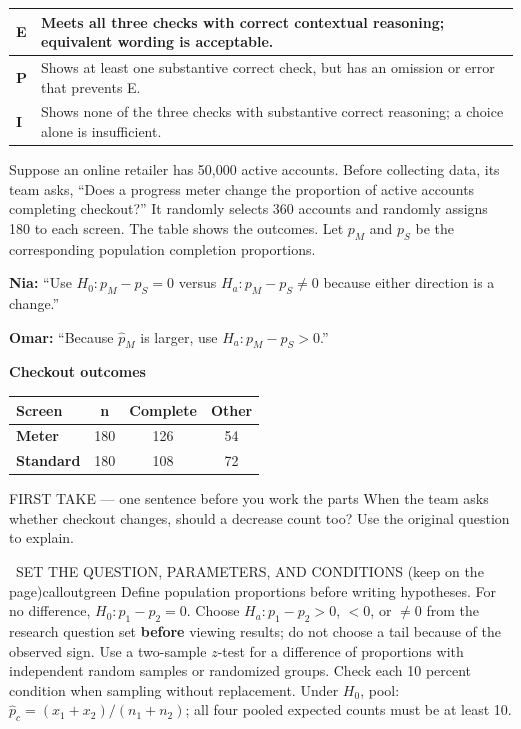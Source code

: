 \documentclass[11pt]{article}
\begin{document}
{\small\renewcommand{\arraystretch}{1.25}
\noindent\begin{tabular}{|p{0.5in}|p{5.9in}|}
\hline
\textbf{E} & Meets all three checks with correct contextual reasoning; equivalent wording is acceptable. \\ \hline
\textbf{P} & Shows at least one substantive correct check, but has an omission or error that prevents E. \\ \hline
\textbf{I} & Shows none of the three checks with substantive correct reasoning; a choice alone is insufficient. \\ \hline
\end{tabular}}

\clearpage
{}

Suppose an online retailer has 50,000 active accounts. Before collecting data, its team asks, ``Does a progress meter change the proportion of active accounts completing checkout?'' It randomly selects 360 accounts and randomly assigns 180 to each screen. The table shows the outcomes. Let $p_M$ and $p_S$ be the corresponding population completion proportions.\par\smallskip \textbf{Nia:} ``Use $H_0:p_M-p_S=0$ versus $H_a:p_M-p_S\ne0$ because either direction is a change.''\par \textbf{Omar:} ``Because $\hat p_M$ is larger, use $H_a:p_M-p_S>0$.''\par
\begin{center}
\textbf{Checkout outcomes}\par\smallskip
\begin{tabular}{|l|c|c|c|}
\hline
\textbf{Screen} & \textbf{n} & \textbf{Complete} & \textbf{Other} \\ \hline
\textbf{Meter} & 180 & 126 & 54 \\ \hline
\textbf{Standard} & 180 & 108 & 72 \\ \hline
\end{tabular}
\end{center}
\begin{firsttakebox}{FIRST TAKE --- one sentence before you work the parts}
When the team asks whether checkout changes, should a decrease count too? Use the original question to explain.\par
{}
\end{firsttakebox}

\begin{callout}{\IconBook\ SET THE QUESTION, PARAMETERS, AND CONDITIONS (keep on the page)}{calloutgreen}
Define population proportions before writing hypotheses. For no difference,
$H_0:p_1-p_2=0$. Choose $H_a:p_1-p_2>0$, $<0$, or $\ne0$ from the research
question set \textbf{before} viewing results; do not choose a tail because of the observed sign.
Use a two-sample $z$-test for a difference of proportions with independent random samples
or randomized groups. Check each 10 percent condition when sampling without replacement.
Under $H_0$, pool: $\hat p_c=(x_1+x_2)/(n_1+n_2)$; all four pooled expected counts must be at least 10.
\end{callout}
\end{document}
